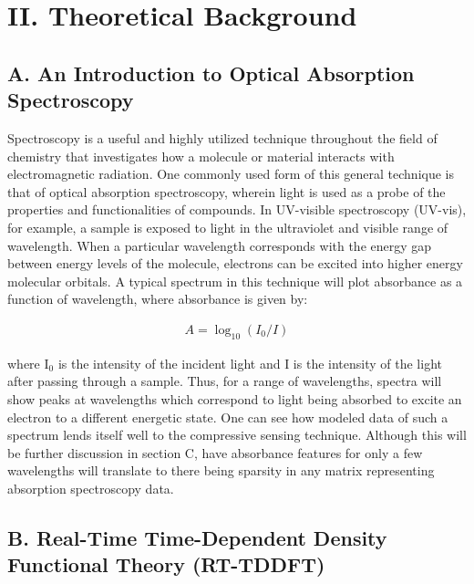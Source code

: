 \documentclass[11pt]{article}
\begin{document}

\section*{II.	Theoretical Background}	%
\subsection*{A.	An Introduction to Optical Absorption Spectroscopy} %

\par Spectroscopy is a useful and highly utilized technique throughout the field of chemistry that investigates how a molecule or material interacts with electromagnetic radiation. One commonly used form of this general technique is that of optical absorption spectroscopy, wherein light is used as a probe of the properties and functionalities of compounds. In UV-visible spectroscopy (UV-vis), for example, a sample is exposed to light in the ultraviolet and visible range of wavelength. When a particular wavelength corresponds with the energy gap between energy levels of the molecule, electrons can be excited into higher energy molecular orbitals. A typical spectrum in this technique will plot absorbance as a function of wavelength, where absorbance is given by:

\begin{align}\label{eq:abs}
A = \log_{10}{(I_0/I)}
\end{align}

where I$_0$ is the intensity of the incident light and I is the intensity of the light after passing through a sample. Thus, for a range of wavelengths, spectra will show peaks at wavelengths which correspond to light being absorbed to excite an electron to a different energetic state. One can see how modeled data of such a spectrum lends itself well to the compressive sensing technique. Although this will be further discussion in section C, have absorbance features for only a few wavelengths will translate to there being sparsity in any matrix representing absorption spectroscopy data. 

\subsection*{B.	Real-Time Time-Dependent Density Functional Theory (RT-TDDFT)} %
\end{document}
